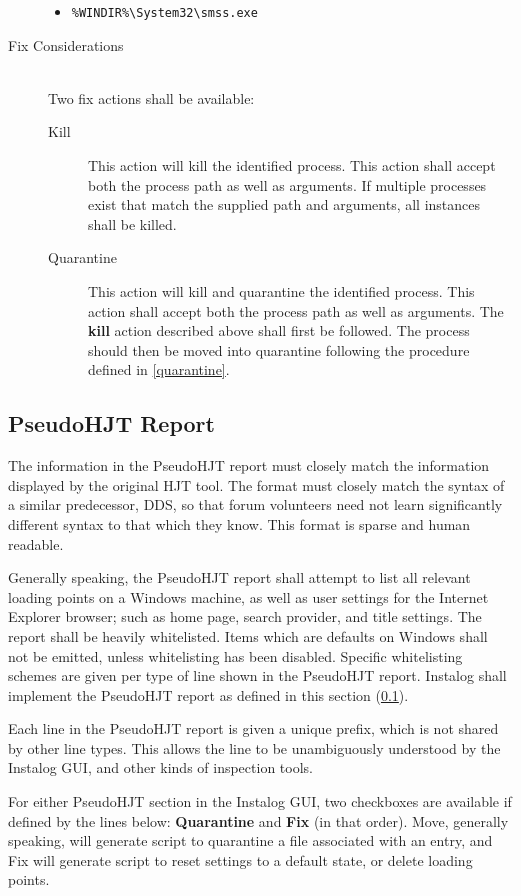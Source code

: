 \begin{description}
\begin{itemize}
  \item \verb|%WINDIR%\System32\smss.exe|
\end{itemize}
\item[Fix Considerations] \hfill \\
Two fix actions shall be available:
\begin{description}
\item[Kill] This action will kill the identified process.  This action shall
accept both the process path as well as arguments.  If multiple processes exist
that match the supplied path and arguments, all instances shall be killed. 
\item[Quarantine]  This action will kill and quarantine the identified
process.  This action shall accept both the process path as well as arguments. 
The \textbf{kill} action described above shall first be followed.  The process
should then be moved into quarantine following the procedure defined in
\ref{quarantine}.  
\end{description}
\end{description}

\subsection{PseudoHJT Report} \label{hjtgeneral}
The information in the PseudoHJT report must closely match the information
displayed by the original HJT tool. The format must closely match the syntax of
a similar predecessor, DDS, so that forum volunteers need not learn
significantly different syntax to that which they know. This format is
sparse and human readable. 

Generally speaking, the PseudoHJT report shall attempt to list all relevant
loading points on a Windows machine, as well as user settings for the Internet
Explorer browser; such as home page, search provider, and title settings. The
report shall be heavily whitelisted. Items which are defaults on Windows shall
not be emitted, unless whitelisting has been disabled. Specific whitelisting
schemes are given per type of line shown in the PseudoHJT report. Instalog shall
implement the PseudoHJT report as defined in this section (\ref{hjtgeneral}).

Each line in the PseudoHJT report is given a unique prefix, which is not shared
by other line types. This allows the line to be unambiguously understood by the
Instalog GUI, and other kinds of inspection tools.

For either PseudoHJT section in the Instalog GUI, two checkboxes are available
if defined by the lines below: \textbf{Quarantine} and \textbf{Fix} (in that
order).  Move, generally speaking, will generate script to quarantine a file
associated with an entry, and Fix will generate script to reset settings to a
default state, or delete loading points.

